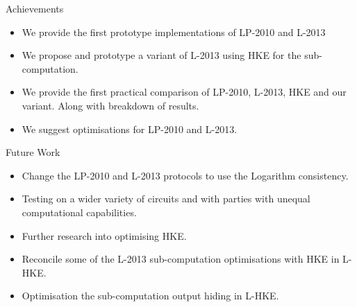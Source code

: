\documentclass[t, 12pt]{beamer}            %
\begin{document}
\begin{frame}{Achievements}
	\begin{itemize} %
		\item We provide the first prototype implementations of LP-2010 and L-2013
		\item We propose and prototype a variant of L-2013 using HKE for the sub-computation.
		\item We provide the first practical comparison of LP-2010, L-2013, HKE and our variant. Along with breakdown of results.
		\item We suggest optimisations for LP-2010 and L-2013.
		
	\end{itemize}
\end{frame}


\begin{frame}{Future Work}
	\begin{itemize} %
		\item Change the LP-2010 and L-2013  protocols to use the Logarithm consistency.
		\item Testing on a wider variety of circuits and with parties with unequal computational capabilities.
		\item Further research into optimising HKE.
		\item Reconcile some of the L-2013 sub-computation optimisations with HKE in L-HKE.
		\item Optimisation the sub-computation output hiding in L-HKE.
		
	\end{itemize}
\end{frame}
\end{document}
